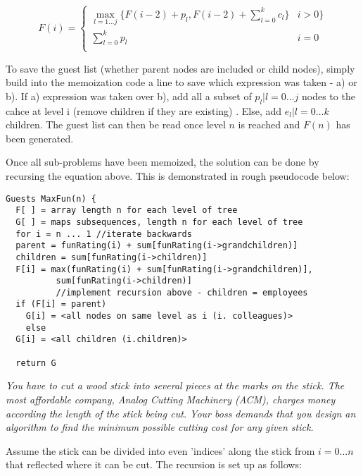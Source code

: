 \documentclass[11pt, a4paper]{article}
\begin{document}
\[ F(i) = \begin{cases}
    \max \limits_{l = 1 \dots j} \{F(i-2) + p_l , F(i-2) + \sum_{l= 0}^{k}  {c_l}\}& i > 0\} \\
    \sum_{l= 0}^{k} {p_l} & i = 0\\
        \end{cases}
\]

To save the guest list (whether parent nodes are included or child nodes), simply build into the memoization code a line to save which expression was taken - a) or b). If a) expression was taken over b), add all a subset of $p_l | l = 0 \dots j$ nodes to the cahce at level i (remove children if they are existing) . Else, add $e_l | l = 0 \dots k$ children. The guest list can then be read once level $n$ is reached and $F(n)$ has been generated.

Once all sub-problems have been memoized, the solution can be done by recursing the equation above. This is demonstrated in rough pseudocode below:

\begin{lstlisting}[frame=single]
Guests MaxFun(n) {
  F[ ] = array length n for each level of tree
  G[ ] = maps subsequences, length n for each level of tree
  for i = n ... 1 //iterate backwards
  parent = funRating(i) + sum[funRating(i->grandchildren)]
  children = sum[funRating(i->children)]
  F[i] = max(funRating(i) + sum[funRating(i->grandchildren)], 
          sum[funRating(i->children)] 
          //implement recursion above - children = employees
  if (F[i] = parent) 
    G[i] = <all nodes on same level as i (i. colleagues)>
    else 
  G[i] = <all children (i.children)>
    
  return G
\end{lstlisting}

\vspace{40mm}

\textit{You have to cut a wood stick into several pieces at the marks on the stick. The most affordable company, Analog Cutting Machinery (ACM), charges money according the length of the stick being cut. Your boss demands that you design an algorithm to find the minimum possible cutting cost for any given stick.}

\vspace{2mm}

Assume the stick can be divided into even 'indices' along the stick from $i = 0 \dots n$ that reflected where it can be cut.
The recursion is set up as follows:
\end{document}
